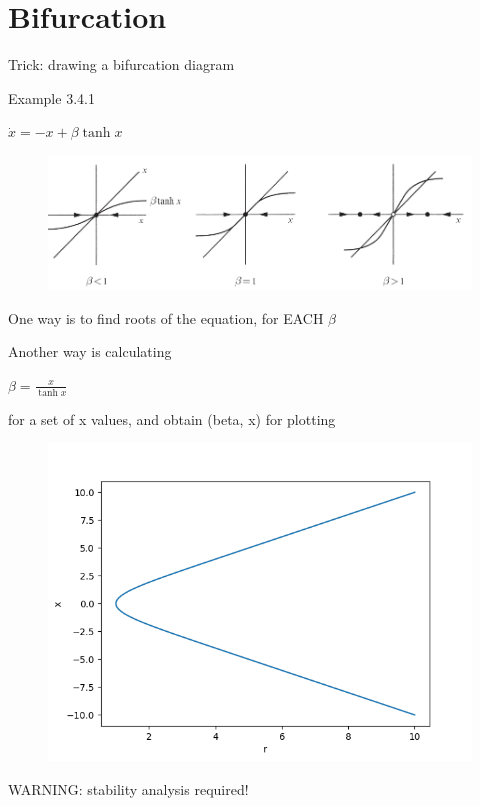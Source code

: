 \documentclass[9pt,aspectratio=43,mathserif,table]{beamer}
\begin{document}
\section{Bifurcation}
\begin{frame}{Trick: drawing a bifurcation diagram}
   
  \begin{multicols}{2}
   Example 3.4.1

   $\dot x = - x + \beta \tanh x$

    \begin{figure}[!h]
      \centering
      \includegraphics[width=.5\textwidth]{fig/betatanhx.png}
    \end{figure}
 
   One way is to find roots of the equation, for EACH $\beta$

   Another way is calculating

   $\beta = \frac{ x}{ \tanh x}$

   for a set of x values, and obtain (beta, x) for plotting

    \begin{figure}[!h]
      \centering
      \includegraphics[width=.5\textwidth]{fig/betatanhx_bifurcation.png}
    \end{figure}
 
  WARNING: stability analysis required!
  \end{multicols}

\end{frame}
\end{document}
